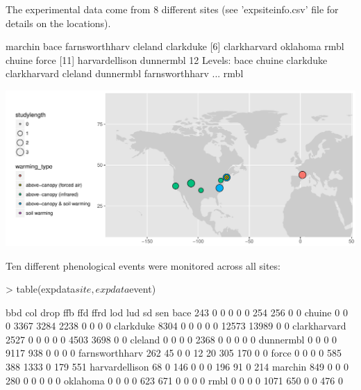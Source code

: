 \documentclass{article}
\begin{document}
The experimental data come from 8 different sites (see 'expsiteinfo.csv' file for details on the locations).

\begin{Schunk}
\begin{Soutput}
 [1] marchin        bace           farnsworthharv cleland        clarkduke     
 [6] clarkharvard   oklahoma       rmbl           chuine         force         
[11] harvardellison dunnermbl     
12 Levels: bace chuine clarkduke clarkharvard cleland dunnermbl farnsworthharv ... rmbl
\end{Soutput}
\end{Schunk}
\includegraphics{maps/expsites.pdf}

Ten different phenological events were monitored across all sites:
\begin{Schunk}
\begin{Sinput}
> table(expdata$site, expdata$event)
\end{Sinput}
\begin{Soutput}
                   bbd   col  drop   ffb   ffd  ffrd   lod   lud    sd   sen
  bace             243     0     0     0     0     0   254   256     0     0
  chuine             0     0     0  3367  3284  2238     0     0     0     0
  clarkduke       8304     0     0     0     0     0 12573 13989     0     0
  clarkharvard    2527     0     0     0     0     0  4503  3698     0     0
  cleland            0     0     0     0  2368     0     0     0     0     0
  dunnermbl          0     0     0     0  9117   938     0     0     0     0
  farnsworthharv   262    45     0     0    12    20   305   170     0     0
  force              0     0     0     0   585   388  1333     0   179   551
  harvardellison    68     0   146     0     0     0   196    91     0   214
  marchin          849     0     0     0   280     0     0     0     0     0
  oklahoma           0     0     0     0   623   671     0     0     0     0
  rmbl               0     0     0     0  1071   650     0     0   476     0
\end{Soutput}
\end{Schunk}
\end{document}
